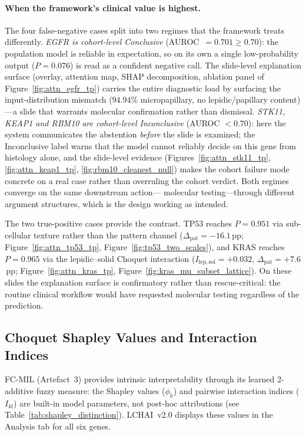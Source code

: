 \paragraph{When the framework's clinical value is highest.}
The four false-negative cases split into two regimes that the
framework treats differently.
\emph{EGFR is cohort-level Conclusive}
(AUROC~$= 0.701 \geq 0.70$): the population model is reliable
in expectation, so on its own a single low-probability output
($P = 0.076$) is read as a confident negative call.
The slide-level explanation surface (overlay, attention map,
SHAP decomposition, ablation panel of
Figure~\ref{fig:attn_egfr_tp}) carries the entire diagnostic
load by surfacing the input-distribution mismatch
($94.94\%$ micropapillary, no lepidic/papillary content)---a
slide that warrants molecular confirmation rather than
dismissal.
\emph{STK11, KEAP1 and RBM10 are cohort-level Inconclusive}
(AUROC $< 0.70$): here the system communicates the abstention
\emph{before} the slide is examined; the Inconclusive label
warns that the model cannot reliably decide on this gene
from histology alone, and the slide-level evidence
(Figures~\ref{fig:attn_stk11_tp},
\ref{fig:attn_keap1_tp},
\ref{fig:rbm10_cleanest_null}) makes the cohort failure mode
concrete on a real case rather than overruling the cohort
verdict.
Both regimes converge on the same downstream action---%
molecular testing---through different argument structures,
which is the design working as intended.

The two true-positive cases provide the contrast.
TP53 reaches $P = 0.951$ via sub-cellular texture rather than
the pattern channel ($\Delta_{\mathrm{pat}} = -16.1$\,pp;
Figure~\ref{fig:attn_tp53_tp},
Figure~\ref{fig:tp53_two_scales}), and KRAS reaches
$P = 0.965$ via the lepidic--solid Choquet interaction
($I_{\mathrm{lep,sol}} = +0.032$,
$\Delta_{\mathrm{pat}} = +7.6$\,pp;
Figure~\ref{fig:attn_kras_tp},
Figure~\ref{fig:kras_mu_subset_lattice}).
On these slides the explanation surface is confirmatory rather
than rescue-critical: the routine clinical workflow would have
requested molecular testing regardless of the prediction.


\subsection{Choquet Shapley Values and Interaction Indices}
\label{sec:eval:interp:choquet}

FC-MIL (Artefact~3) provides intrinsic
interpretability through its learned 2-additive fuzzy measure:
the Shapley values ($\phi_k$) and pairwise interaction indices
($I_{kl}$) are built-in model parameters, not post-hoc
attributions (see Table~\ref{tab:shapley_distinction}).
LCHAI~v2.0 displays these values in the Analysis tab for
all six genes.


